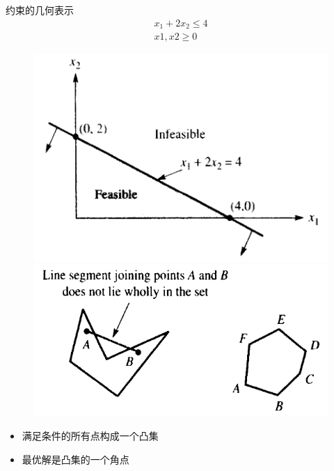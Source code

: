 \documentclass[UTF8]{ctexbeamer}
\begin{document}
\begin{frame}{约束的几何表示}
  \[
  \begin{array}{l}
    x_1 + 2x_2 \le 4\\
    x1, x2 \ge 0
  \end{array}
  \]
  \begin{figure}
    \includegraphics[width=.5\textwidth{}]{feasible.png}
    \includegraphics[width=.5\textwidth{}]{convex.png}
  \end{figure}  

  \begin{itemize}
  \item 满足条件的所有点构成一个凸集
  \item 最优解是凸集的一个角点
  \end{itemize}

\end{frame}
\end{document}
